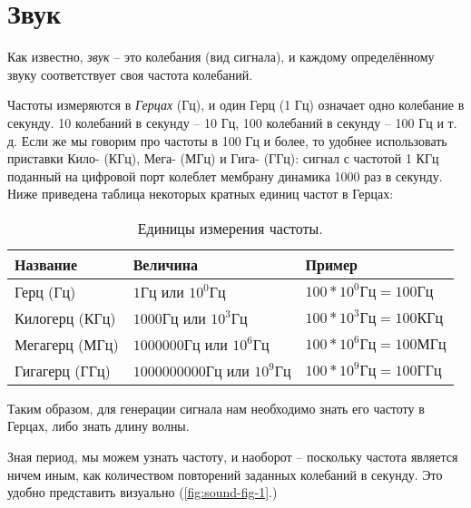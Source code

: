 \documentclass[../sparc.tex]{subfiles}
\begin{document}
\section{Звук}


Как известно, \emph{звук} -- это колебания (вид сигнала), и каждому
определённому звуку соответствует своя частота колебаний.

Частоты измеряются в \emph{Герцах} (\gls{Гц}), и один Герц (1 Гц) означает одно
колебание в секунду. 10 колебаний в секунду -- 10 Гц, 100 колебаний в секунду --
100 Гц и т. д. Если же мы говорим про частоты в 100 Гц и более, то удобнее
использовать приставки Кило- (\gls{КГц}), Мега- (\gls{МГц}) и Гига- (\gls{ГГц}):
сигнал с частотой 1 КГц поданный на цифровой порт колеблет мембрану динамика
1000 раз в секунду.  Ниже приведена таблица некоторых кратных единиц частот в
Герцах:

\begin{table}[h]
  \centering
  \begin{tabular}{p{3cm}|p{4cm}|p{3.5cm}}
    Название & Величина & Пример \\
    \hline \hline
    Герц (Гц)
    & $ 1 \mbox{Гц} $ или $ 10^0 \mbox{Гц} $
    & $ 100 * 10^0 \mbox{Гц} = 100 \mbox{Гц} $ \\
    \hline
    Килогерц (КГц)
    & $ 1000 \mbox{Гц} $ или $ 10^3 \mbox{Гц} $
    & $ 100 * 10^3 \mbox{Гц} = 100 \mbox{КГц} $ \\
    \hline
    Мегагерц (МГц)
    & $ 1000000 \mbox{Гц} $ или $ 10^6 \mbox{Гц} $
    & $ 100 * 10^6 \mbox{Гц} = 100 \mbox{МГц} $ \\
    \hline
    Гигагерц (ГГц)
    & $ 1000000000 \mbox{Гц} $ или $ 10^9 \mbox{Гц} $
    & $ 100 * 10^9 \mbox{Гц} = 100 \mbox{ГГц} $ \\
  \end{tabular}
  \caption{Единицы измерения частоты.}
  \label{table:sound-hertz-scale}
\end{table}

Таким образом, для генерации сигнала нам необходимо знать его частоту в Герцах,
либо знать длину волны.

Зная период, мы можем узнать частоту, и наоборот -- поскольку частота является
ничем иным, как количеством повторений заданных колебаний в секунду. Это удобно
представить визуально (\ref{fig:sound-fig-1}.)
\end{document}
